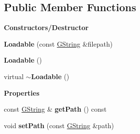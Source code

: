 \subsection*{Public Member Functions}
\begin{Indent}\textbf{ Constructors/\+Destructor}\par
\begin{DoxyCompactItemize}
\item 
\mbox{\label{classrev_1_1_loadable_a2afb5add9e1083db139014cb8128dc62}} 
{\bfseries Loadable} (const \mbox{\hyperlink{classrev_1_1_g_string}{G\+String}} \&filepath)
\item 
\mbox{\label{classrev_1_1_loadable_abb954162ad6d892a63b98d19f2edce37}} 
{\bfseries Loadable} ()
\item 
\mbox{\label{classrev_1_1_loadable_a51d448b27a3783e76a549fc2617407d8}} 
virtual {\bfseries $\sim$\+Loadable} ()
\end{DoxyCompactItemize}
\end{Indent}
\begin{Indent}\textbf{ Properties}\par
\begin{DoxyCompactItemize}
\item 
\mbox{\label{classrev_1_1_loadable_a1f9ab14b66f43ef9bc0faf0d15eab29c}} 
const \mbox{\hyperlink{classrev_1_1_g_string}{G\+String}} \& {\bfseries get\+Path} () const
\item 
\mbox{\label{classrev_1_1_loadable_aa3fee814c8f85e53911fbef2b59aa4d4}} 
void {\bfseries set\+Path} (const \mbox{\hyperlink{classrev_1_1_g_string}{G\+String}} \&path)
\end{DoxyCompactItemize}
\end{Indent}
